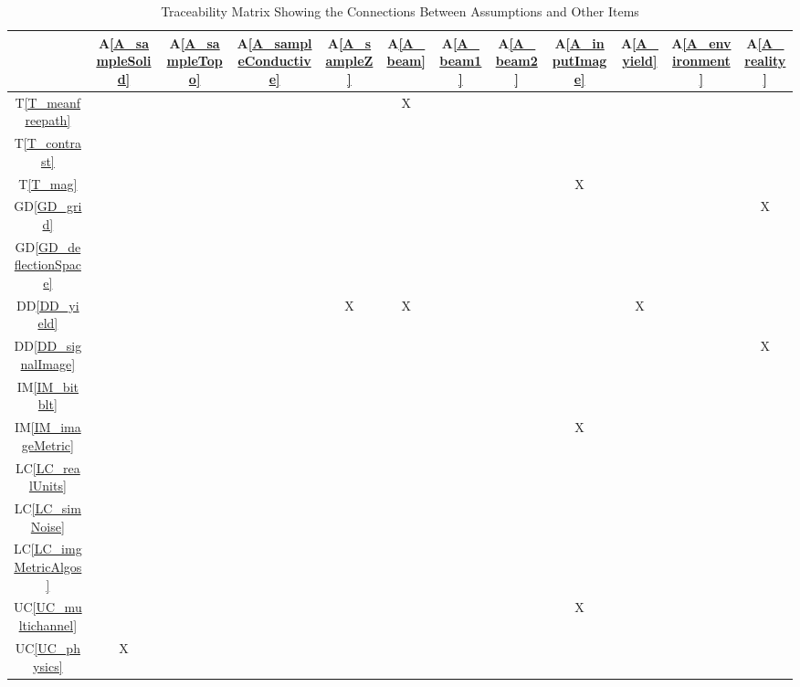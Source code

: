 \documentclass[12pt]{article}
\newcommand{\dref}[1]{GD\ref{#1}}
\newcommand{\ddref}[1]{DD\ref{#1}}
\newcommand{\tref}[1]{T\ref{#1}}
\newcommand{\aref}[1]{A\ref{#1}}
\newcommand{\iref}[1]{IM\ref{#1}}
\newcommand{\lcref}[1]{LC\ref{#1}}
\newcommand{\ucref}[1]{UC\ref{#1}}
\begin{document}
\begin{table}[h!]
\centering
\begin{tabular}{|c|c|c|c|c|c|c|c|c|c|c|c|}
\hline
	& \aref{A_sampleSolid}
	& \aref{A_sampleTopo}
	& \aref{A_sampleConductive}
	& \aref{A_sampleZ}
	& \aref{A_beam}
	& \aref{A_beam1}
	& \aref{A_beam2}
	& \aref{A_inputImage}
	& \aref{A_yield}
	& \aref{A_environment}
	& \aref{A_reality}
\\ \hline
\tref{T_meanfreepath}      & & & & &X& & & & & &  \\ \hline
\tref{T_contrast}          & & & & & & & & & & &  \\ \hline
\tref{T_mag}               & & & & & & & &X& & &  \\ \hline
\dref{GD_grid}             & & & & & & & & & & &X \\ \hline
\dref{GD_deflectionSpace}  & & & & & & & & & & &  \\ \hline
\ddref{DD_yield}           & & & &X&X& & & &X& &  \\ \hline
\ddref{DD_signalImage}     & & & & & & & & & & &X \\ \hline
\iref{IM_bitblt}           & & & & & & & & & & &  \\ \hline
\iref{IM_imageMetric}      & & & & & & & &X& & &  \\ \hline
\lcref{LC_realUnits}       & & & & & & & & & & &  \\ \hline
\lcref{LC_simNoise}        & & & & & & & & & & &  \\ \hline
\lcref{LC_imgMetricAlgos}  & & & & & & & & & & &  \\ \hline
\ucref{UC_multichannel}    & & & & & & & &X& & &  \\ \hline
\ucref{UC_physics}         &X& & & & & & & & & &  \\ \hline
\end{tabular}
\caption{Traceability Matrix Showing the Connections Between Assumptions and Other Items}
\label{Table:A_trace}
\end{table}
\end{document}
